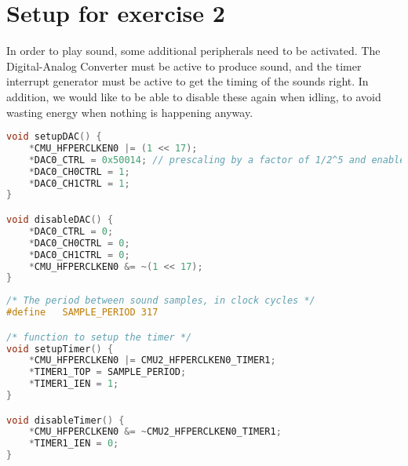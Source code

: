 \section{Setup for exercise 2}
In order to play sound, some additional peripherals need to be activated. The Digital-Analog Converter must be active to produce sound, and the timer interrupt generator must be active to get the timing of the sounds right. In addition, we would like to be able to disable these again when idling, to avoid wasting energy when nothing is happening anyway.

\begin{minipage}{\linewidth}
\begin{lstlisting}[language=C, label=setup_dac, caption=Setting up and disabling the DAC]
void setupDAC() {
    *CMU_HFPERCLKEN0 |= (1 << 17);
    *DAC0_CTRL = 0x50014; // prescaling by a factor of 1/2^5 and enable output to pin
    *DAC0_CH0CTRL = 1;
    *DAC0_CH1CTRL = 1;
}

void disableDAC() {
    *DAC0_CTRL = 0;
    *DAC0_CH0CTRL = 0;
    *DAC0_CH1CTRL = 0;
    *CMU_HFPERCLKEN0 &= ~(1 << 17);
}
\end{lstlisting}
\end{minipage}

\begin{minipage}{\linewidth}
\begin{lstlisting}[language=C, label=setup_timer, caption=Setting up and disabling the timer]
/* The period between sound samples, in clock cycles */
#define   SAMPLE_PERIOD 317

/* function to setup the timer */
void setupTimer() {
    *CMU_HFPERCLKEN0 |= CMU2_HFPERCLKEN0_TIMER1;
    *TIMER1_TOP = SAMPLE_PERIOD;
    *TIMER1_IEN = 1;
}

void disableTimer() {
    *CMU_HFPERCLKEN0 &= ~CMU2_HFPERCLKEN0_TIMER1;
    *TIMER1_IEN = 0;
}
\end{lstlisting}
\end{minipage}
